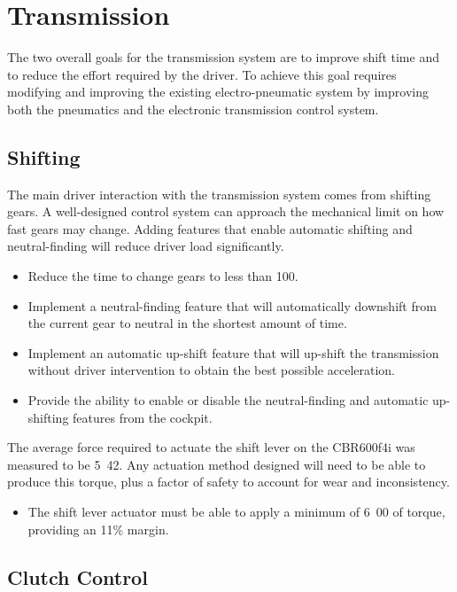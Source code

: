 \section{Transmission\label{sec:goals_transmission}}

The two overall goals for the transmission system are to improve shift time and to reduce the effort required by the driver. To achieve this goal requires modifying and improving the existing electro-pneumatic system by improving both the pneumatics and the electronic transmission control system. 

\subsection{Shifting}

The main driver interaction with the transmission system comes from shifting gears. A well-designed control system can approach the mechanical limit on how fast gears may change. Adding features that enable automatic shifting and neutral-finding will reduce driver load significantly.

\begin{itemize}
\item Reduce the time to change gears to less than \unit{100}{\milli\second}. 
\item Implement a neutral-finding feature that will automatically downshift from the current gear to neutral in the shortest amount of time.
\item Implement an automatic up-shift feature that will up-shift the transmission without driver intervention to obtain the best possible acceleration.
\item Provide the ability to enable or disable the neutral-finding and automatic up-shifting features from the cockpit.
\end{itemize}

The average force required to actuate the shift lever on the CBR600f4i was measured to be \unit{5.42}{\newton\metre}. Any actuation method designed will need to be able to produce this torque, plus a factor of safety to account for wear and inconsistency.

\begin{itemize}
\item The shift lever actuator must be able to apply a minimum of \unit{6.00}{\newton\metre} of torque, providing an 11\% margin.
\end{itemize}

\subsection{Clutch Control}

